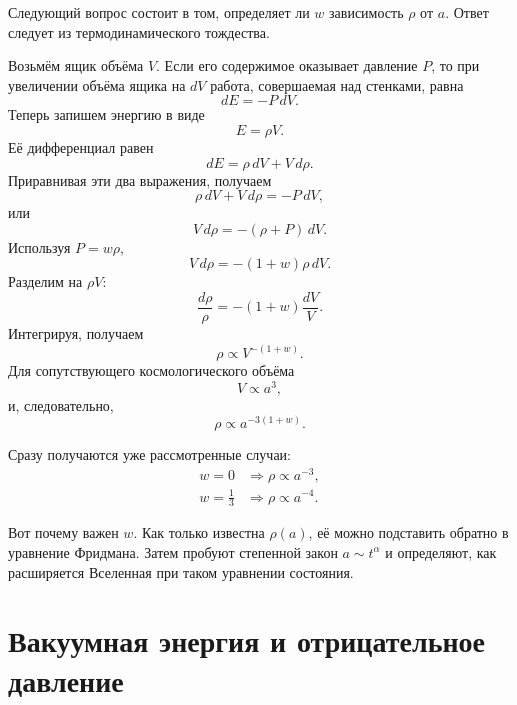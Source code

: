 Следующий вопрос состоит в том, определяет ли \(w\) зависимость \(\rho\) от \(a\). Ответ следует из термодинамического тождества.

Возьмём ящик объёма \(V\). Если его содержимое оказывает давление \(P\), то при увеличении объёма ящика на \(dV\) работа, совершаемая над стенками, равна
\begin{equation}
dE=-P\,dV.
\end{equation}
Теперь запишем энергию в виде
\begin{equation}
E=\rho V.
\end{equation}
Её дифференциал равен
\begin{equation}
dE=\rho\,dV+V\,d\rho .
\end{equation}
Приравнивая эти два выражения, получаем
\begin{equation}
\rho\,dV+V\,d\rho=-P\,dV,
\end{equation}
или
\begin{equation}
V\,d\rho=-(\rho+P)\,dV.
\end{equation}
Используя \(P=w\rho\),
\begin{equation}
V\,d\rho=-(1+w)\rho\,dV.
\end{equation}
Разделим на \(\rho V\):
\begin{equation}
\frac{d\rho}{\rho}=-(1+w)\frac{dV}{V}.
\end{equation}
Интегрируя, получаем
\begin{equation}
\rho \propto V^{-(1+w)}.
\end{equation}
Для сопутствующего космологического объёма
\begin{equation}
V\propto a^3,
\end{equation}
и, следовательно,
\begin{equation}
\rho \propto a^{-3(1+w)}.
\end{equation}

Сразу получаются уже рассмотренные случаи:
\begin{align}
w=0 &\Longrightarrow \rho \propto a^{-3},\\
w=\frac{1}{3} &\Longrightarrow \rho \propto a^{-4}.
\end{align}

Вот почему важен \(w\). Как только известна \(\rho(a)\), её можно подставить обратно в уравнение Фридмана. Затем пробуют степенной закон \(a\sim t^\alpha\) и определяют, как расширяется Вселенная при таком уравнении состояния.

\section{Вакуумная энергия и отрицательное давление}


